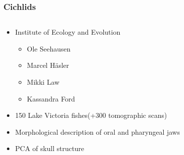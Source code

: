 \documentclass[aspectratio=169]{beamer}
\begin{document}
\begin{frame}
	\frametitle{Cichlids}
	\begin{columns}
		\begin{column}{0.495\linewidth}
			\begin{itemize}
				\item Institute of Ecology and Evolution
				\begin{itemize}%
					\item Ole Seehausen
					\item Marcel Häsler
					\item Mikki Law
					\item Kassandra Ford
				\end{itemize}
				\item 150 Lake Victoria fishes\newline (+300 tomographic scans)
				\item Morphological description of oral and pharyngeal jaws
				\item PCA of skull structure
			\end{itemize}
		\end{column}
		\begin{column}{0.495\linewidth}
%
		\end{column}
	\end{columns}
\end{frame}
\end{document}
